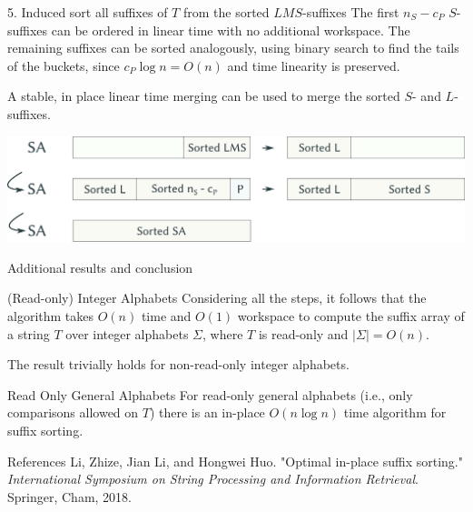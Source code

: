 \documentclass{beamer}
\begin{document}
  \begin{frame}{5. Induced sort all suffixes of $T$ from the sorted $LMS$-suffixes}
    The first $n_S - c_P$ $S$-suffixes can be ordered in linear time with no additional workspace. The remaining suffixes can be sorted analogously, using binary search to find the tails of the buckets, since $c_P \log n = O(n)$ and time linearity is preserved.

    A stable, in place linear time merging can be used to merge the sorted $S$- and $L$-suffixes.
    \begin{center}
      \includegraphics[width=1\textwidth]{img/SA_sorted.pdf}
    \end{center}
  \end{frame}


  \begin{frame}{Additional results and conclusion}
    \begin{block}{(Read-only) Integer Alphabets}
      \vspace{1pt}
      Considering all the steps, it follows that the algorithm takes $O(n)$ time and $O(1)$ workspace to compute the suffix array of a string $T$ over integer alphabets $\Sigma$, where $T$ is read-only and $|\Sigma| = O(n)$.
    \end{block}

    The result trivially holds for non-read-only integer alphabets.

    \pause

    \begin{block}{Read Only General Alphabets}
      \vspace{1pt}
      For read-only general alphabets (i.e., only comparisons allowed on $T$) there is an in-place $O(n\log n)$ time algorithm for suffix sorting.
    \end{block}

    \pause

    \begin{block}{References}
      \vspace{1pt}
      Li, Zhize, Jian Li, and Hongwei Huo. "Optimal in-place suffix sorting." \textit{International Symposium on String Processing and Information Retrieval}. Springer, Cham, 2018.
    \end{block}

  \end{frame}
\end{document}
